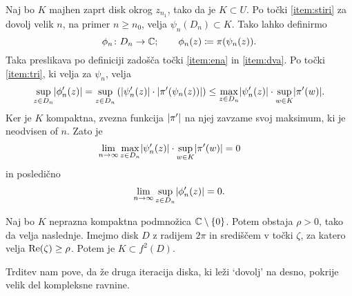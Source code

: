 \begin{dokaz}
    Naj bo \(K\) majhen zaprt disk okrog \(z_{n_1}\), tako da je \(K \subset U\). Po točki \ref{item:stiri} za dovolj velik \(n\), na primer \(n \geq n_0\), velja \(\psi_n (D_n) \subset K\). Tako lahko definirmo
    \[\phi_n \colon D_n \to \mathbb C; \qquad \phi_n (z) \coloneq \pi (\psi_n (z)).\]
    Taka preslikava po definiciji zadošča točki \ref{item:ena} in \ref{item:dva}. Po točki \ref{item:tri}, ki velja za \(\psi_n\), velja
    \[\sup_{z \in D_n} \lvert\phi_n' (z)\rvert = \sup_{z \in D_n} \left( \lvert\psi_n' (z)\rvert \cdot \lvert\pi' (\psi_n (z))\rvert \right) \leq \max_{z \in D_n} \lvert\psi_n' (z)\rvert \cdot \sup_{w \in K} \lvert\pi' (w)\rvert.\]
    Ker je \(K\) kompaktna, zvezna funkcija \(\lvert\pi'\rvert\) na njej zavzame svoj maksimum, ki je neodvisen of \(n\). Zato je
    \[\lim_{n \to \infty} \max_{z \in D_n} \lvert\psi_n' (z)\rvert \cdot \sup_{w \in K} \lvert\pi' (w)\rvert = 0 \qquad\]
    in posledično
    \[\lim_{n \to \infty} \sup_{z \in D_n} \lvert\phi_n' (z)\rvert = 0.\]
\end{dokaz}

\begin{trditev} \label{prop:lare_disks}
    Naj bo \(K\) neprazna kompaktna podmnožica \(\mathbb C \setminus \left\{ 0 \right\}\). Potem obstaja \(\rho > 0\), tako da velja naslednje. Imejmo disk \(D\) z radijem \(2 \pi\) in središčem v točki \(\zeta\), za katero velja \(\operatorname{Re} (\zeta) \geq \rho\). Potem je \(K \subset f^2 (D)\).
\end{trditev}

\noindent Trditev nam pove, da že druga iteracija diska, ki leži `dovolj' na desno, pokrije velik del kompleksne ravnine.

